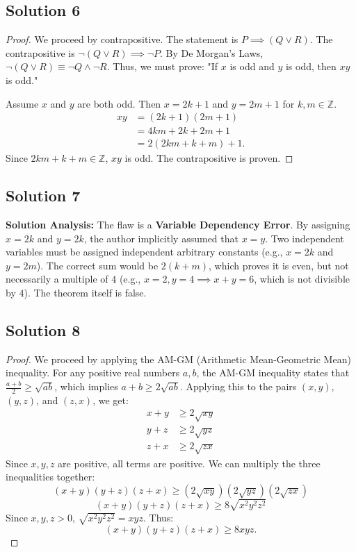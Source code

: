 \documentclass[11pt]{article}
\begin{document}
\subsection{Solution 6}
\begin{proof}
We proceed by contrapositive. The statement is $P \implies (Q \lor R)$. The contrapositive is $\neg(Q \lor R) \implies \neg P$. By De Morgan's Laws, $\neg(Q \lor R) \equiv \neg Q \land \neg R$. 
Thus, we must prove: "If $x$ is odd and $y$ is odd, then $xy$ is odd."

Assume $x$ and $y$ are both odd. Then $x = 2k + 1$ and $y = 2m + 1$ for $k, m \in \mathbb{Z}$.
\begin{align*}
xy &= (2k + 1)(2m + 1) \\
&= 4km + 2k + 2m + 1 \\
&= 2(2km + k + m) + 1.
\end{align*}
Since $2km + k + m \in \mathbb{Z}$, $xy$ is odd. The contrapositive is proven.
\end{proof}

\subsection{Solution 7}
\textbf{Solution Analysis:} The flaw is a \textbf{Variable Dependency Error}. By assigning $x = 2k$ and $y = 2k$, the author implicitly assumed that $x = y$. Two independent variables must be assigned independent arbitrary constants (e.g., $x = 2k$ and $y = 2m$). The correct sum would be $2(k+m)$, which proves it is even, but not necessarily a multiple of $4$ (e.g., $x=2, y=4 \implies x+y=6$, which is not divisible by $4$). The theorem itself is false.

\subsection{Solution 8}
\begin{proof}
We proceed by applying the AM-GM (Arithmetic Mean-Geometric Mean) inequality. For any positive real numbers $a, b$, the AM-GM inequality states that $\frac{a+b}{2} \ge \sqrt{ab}$, which implies $a+b \ge 2\sqrt{ab}$.
Applying this to the pairs $(x,y)$, $(y,z)$, and $(z,x)$, we get:
\begin{align*}
x + y &\ge 2\sqrt{xy} \\
y + z &\ge 2\sqrt{yz} \\
z + x &\ge 2\sqrt{zx}
\end{align*}
Since $x, y, z$ are positive, all terms are positive. We can multiply the three inequalities together:
\[ (x+y)(y+z)(z+x) \ge (2\sqrt{xy})(2\sqrt{yz})(2\sqrt{zx}) \]
\[ (x+y)(y+z)(z+x) \ge 8\sqrt{x^2 y^2 z^2} \]
Since $x, y, z > 0$, $\sqrt{x^2 y^2 z^2} = xyz$. Thus:
\[ (x+y)(y+z)(z+x) \ge 8xyz. \]
\end{proof}
\end{document}
